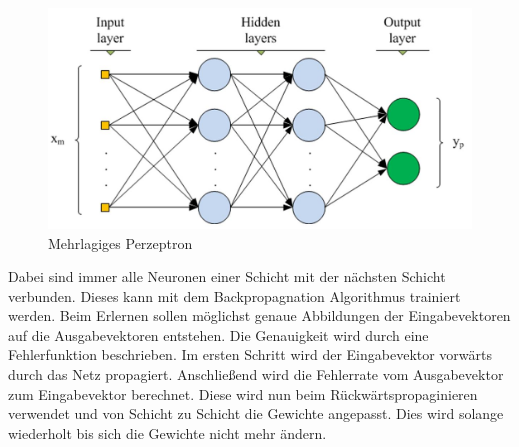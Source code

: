 \begin{figure}[h]
	\includegraphics[width=1\linewidth]{Bilder/multilayer_perzeptron}
	\caption{Mehrlagiges Perzeptron}\label{Perzeptron}
\end{figure} 
Dabei sind immer alle Neuronen einer Schicht mit der nächsten Schicht verbunden. Dieses kann mit dem Backpropagnation Algorithmus trainiert werden. Beim Erlernen sollen möglichst genaue Abbildungen der Eingabevektoren auf die Ausgabevektoren entstehen. Die Genauigkeit wird durch eine Fehlerfunktion beschrieben.  Im ersten Schritt wird der Eingabevektor vorwärts durch das Netz propagiert. Anschließend wird die Fehlerrate vom Ausgabevektor zum Eingabevektor berechnet.  Diese wird nun beim Rückwärtspropaginieren verwendet und von Schicht zu Schicht die Gewichte angepasst. Dies wird solange wiederholt bis sich die Gewichte nicht mehr ändern. 


